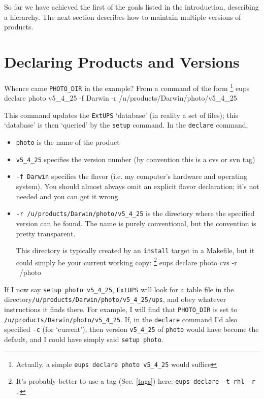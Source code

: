 \documentclass{article}
\newcommand{\code}[1]{\texttt{#1}}
\newcommand{\eups}{\code{ExtUPS}}
\let\overbatim=\verbatim
\let\oendverbatim=\endverbatim
\renewenvironment{verbatim}
{\center\minipage{16cm}\overbatim}
{\oendverbatim\endminipage\endcenter}
\begin{document}
So far we have achieved the first of the goals listed in the introduction,
describing a hierarchy.   The next section describes how to maintain
multiple versions of products.

\section{Declaring Products and Versions}

Whence came \code{PHOTO\_DIR} in the example? From a command of the form
\footnote{Actually, a simple \code{eups declare photo v5\_4\_25} would suffice}
\begin{verbatim}
eups declare photo v5_4_25 -f Darwin -r /u/products/Darwin/photo/v5_4_25
\end{verbatim}

This command updates the \eups{} `database' (in reality a set of files);
this `database' is then `queried' by the \code{setup} command. In
the \code{declare} command,
\begin{itemize}
  \item
    \code{photo} is the name of the product

  \item
    \code{v5\_4\_25} specifies the version number (by convention this
    is a cvs or svn tag)

  \item
    \code{-f Darwin} specifies the flavor (i.e. my computer's hardware and
    operating system).  You should almost always omit an explicit flavor declaration;
    it's not needed and you can get it wrong.

  \item
    \code{-r /u/products/Darwin/photo/v5\_4\_25} is the directory where
    the specified version can be found. The name is purely conventional,
    but the convention is pretty transparent.

    This directory is typically created by an \code{install} target
    in a Makefile, but it could simply be your current working
    copy: \footnote{It's probably better to use a tag (Sec. \ref{tags}) here: \code{eups declare -t rhl -r .}}
    \vspace{-7mm}
\begin{verbatim}
       eups declare photo cvs -r ~/photo
\end{verbatim}
\end{itemize}

If I now say \code{setup photo v5\_4\_25}, \eups{} will look for
a table file in the directory\hfil\break \code{/u/products/Darwin/photo/v5\_4\_25/ups},
and obey whatever instructions it finds there.  For example,
I will find that
\code{PHOTO\_DIR} is set to \code{/u/products/Darwin/photo/v5\_4\_25}. If,
in the \code{declare} command I'd also specified \code{-c} (for
`current'), then version \code{v5\_4\_25} of \code{photo} would
have become the default, and I could have simply said \code{setup photo}.
\end{document}
